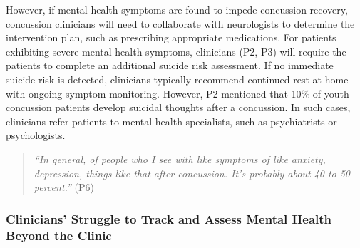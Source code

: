 However, if mental health symptoms are found to impede concussion recovery, concussion clinicians will need to collaborate with neurologists to determine the intervention plan, such as prescribing appropriate medications. 
For patients exhibiting severe mental health symptoms, clinicians (P2, P3) will require the patients to complete an additional suicide risk assessment. 
If no immediate suicide risk is detected, clinicians typically recommend continued rest at home with ongoing symptom monitoring. 
However, P2 mentioned that 10\% of youth concussion patients develop suicidal thoughts after a concussion. 
In such cases, clinicians refer patients to mental health specialists, such as psychiatrists or psychologists.
\begin{quote}
    \textit{``In general, of people who I see with like symptoms of like anxiety, depression, things like that after concussion. It's probably about 40 to 50 percent.''} (P6)
\end{quote}



\subsubsection{Clinicians’ Struggle to Track and Assess Mental Health Beyond the Clinic}\label{sec:trackinginfo}

